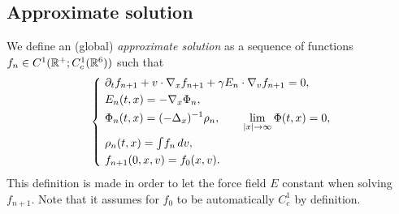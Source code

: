 \documentclass[11pt]{amsart}
\newcommand\tint{{\textstyle\int}}
\begin{document}
\subsection{Approximate solution}

\begin{defn}
We define an (global) \emph{approximate solution} as a sequence of functions $f_n\in C^1(\mathbb{R}^+;C_c^1(\mathbb{R}^6))$ such that
\[\left\{\ \begin{alignedat}{2}
&\pd_tf_{n+1}+v\cdot\del_xf_{n+1}+\gamma E_n\cdot\del_vf_{n+1}=0,\\
&E_n(t,x)=-\del_x\Phi_n,\\
&\Phi_n(t,x)=(-\Delta_x)^{-1}\rho_n,\qquad\lim_{|x|\to\infty}\Phi(t,x)=0,\\
&\rho_n(t,x)=\tint f_n\,dv,\\
&f_{n+1}(0,x,v)=f_0(x,v).
\end{alignedat}\right.\]
This definition is made in order to let the force field $E$ constant when solving $f_{n+1}$.
Note that it assumes for $f_0$ to be automatically $C_c^1$ by definition.
\end{defn}
\end{document}
